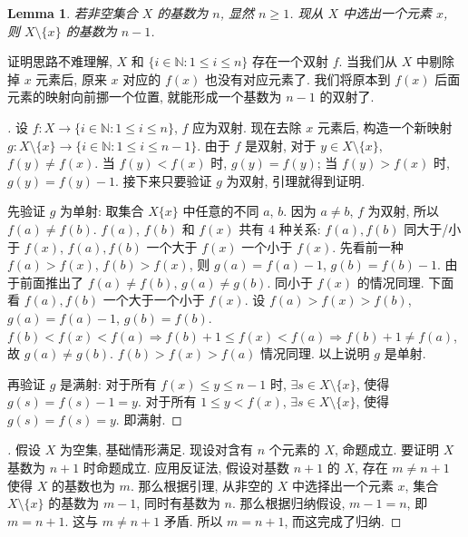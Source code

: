 \documentclass[UTF8]{ctexart}
\theoremstyle{mystyle}
\newtheorem{lemma}{Lemma}[section]
\theoremstyle{myremark}
\theoremstyle{plain}
\newcommand{\N}{\mathbb N}
\newcommand{\set}[1]{\{#1\}}
\begin{document}
\begin{lemma} \label{cardinary}
    若非空集合 $ X $ 的基数为 $ n $, 显然 $ n \geqslant 1 $. 现从 $ X $ 中选出一个元素 $ x $, 则 $ X \setminus \set x $ 的基数为 $ n - 1 $.
\end{lemma}

证明思路不难理解, $ X $ 和 $ \set{i \in \N \colon 1 \leqslant i \leqslant n} $ 存在一个双射 $ f $. 当我们从 $ X $ 中剔除掉 $ x $ 元素后, 原来 $ x $ 对应的 $ f(x) $ 也没有对应元素了. 我们将原本到 $ f(x) $ 后面元素的映射向前挪一个位置, 就能形成一个基数为 $ n - 1 $ 的双射了. 

\begin{proof}[]
    设 $ f \colon X \to \set{i \in \N \colon 1 \leqslant i \leqslant n} $, $ f $ 应为双射. 现在去除 $ x $ 元素后, 构造一个新映射 $ g \colon X \setminus \set x \to \set{i \in \N \colon 1 \leqslant i \leqslant n - 1} $. 由于 $ f $ 是双射, 对于 $ y \in X \setminus \set x $, $ f(y) \neq f(x) $. 当 $ f(y) < f(x) $ 时, $ g(y) = f(y) $; 当 $ f(y) > f(x) $ 时, $ g(y) = f(y) - 1 $. 接下来只要验证 $ g $ 为双射, 引理就得到证明. 
    
    先验证 $ g $ 为单射: 取集合 $ X \set{x} $ 中任意的不同 $ a $, $ b $. 因为 $ a \neq b $, $ f $ 为双射, 所以 $ f(a) \neq f(b) $. $ f(a) $, $ f(b) $ 和 $ f(x) $ 共有 $ 4 $ 种关系: $ f(a), f(b) $ 同大于/小于 $ f(x) $, $ f(a), f(b) $ 一个大于 $ f(x) $ 一个小于 $ f(x) $. 先看前一种 $ f(a) > f(x) $, $ f(b) > f(x) $, 则 $ g(a) = f(a) - 1 $, $ g(b) = f(b) - 1 $. 由于前面推出了 $ f(a) \neq f(b) $, $ g(a) \neq g(b) $. 同小于 $ f(x) $ 的情况同理. 下面看 $ f(a), f(b) $ 一个大于一个小于 $ f(x) $. 设 $ f(a) > f(x) > f(b) $, $ g(a) = f(a) - 1 $, $ g(b) = f(b) $. $ f(b) < f(x) < f(a) \Longrightarrow f(b) + 1 \leqslant f(x) < f(a) \Longrightarrow f(b) + 1 \neq f(a) $, 故 $ g(a) \neq g(b) $. $ f(b) > f(x) > f(a) $ 情况同理. 以上说明 $ g $ 是单射.

    再验证 $ g $ 是满射: 对于所有 $ f(x) \leqslant y \leqslant n - 1 $ 时, $ \exists s \in X \setminus \set x $, 使得 $ g(s) = f(s) - 1 = y $. 对于所有 $ 1 \leqslant y < f(x) $, $ \exists s \in X \setminus \set x $, 使得 $ g(s) = f(s) = y $. 即满射.
\end{proof}


\begin{proof}[]
    假设 $ X $ 为空集, 基础情形满足. 现设对含有 $ n $ 个元素的 $ X $, 命题成立. 要证明 $ X $ 基数为 $ n + 1 $ 时命题成立. 应用反证法, 假设对基数 $ n + 1 $ 的 $ X $, 存在 $ m \neq n + 1 $ 使得 $ X $ 的基数也为 $ m $. 那么根据引理, 从非空的 $ X $ 中选择出一个元素 $ x $, 集合 $ X \setminus \set{x} $ 的基数为 $ m - 1 $, 同时有基数为 $ n $. 那么根据归纳假设, $ m - 1 = n $, 即 $ m = n + 1 $. 这与 $ m \neq n + 1 $ 矛盾. 所以 $ m = n + 1 $, 而这完成了归纳.
\end{proof}
\end{document}

